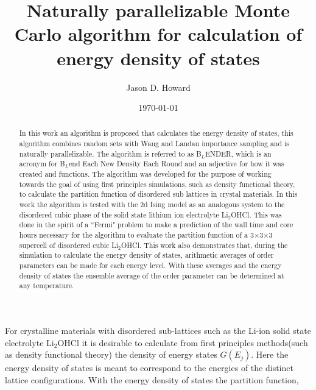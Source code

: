\documentclass[aps,prl,reprint,superscriptaddress,showkeys]{revtex4-1}
\begin{document}
\title{ Naturally   parallelizable  Monte Carlo  algorithm for calculation of energy density of states}

\author{Jason D. Howard}

\date{\today}

%


\begin{acknowledgments}
\end{acknowledgments}
\begin{abstract}
In this work  an algorithm  is proposed that calculates the energy density of states, this algorithm combines random sets with Wang and Landau importance sampling  and is naturally parallelizable. The algorithm is referred to as B$_L$ENDER, which is an acronym for B$_L$end Each New Density Each Round and an  adjective for  how it was created and functions. The algorithm was developed for the purpose of working towards the goal of using first principles simulations, such as density functional theory, to calculate the partition function of disordered sub lattices in crystal materials. In this work  the algorithm is tested with the 2d Ising model as an analogous system to the disordered cubic phase of the solid state lithium ion electrolyte Li$_2$OHCl. This was done in the spirit of a ``Fermi" problem to make a prediction of the  wall time and core hours necessary for the algorithm to evaluate the partition function of a 3$\times$3$\times$3 supercell of disordered cubic Li$_2$OHCl. This work also demonstrates that, during the simulation to calculate the energy density of states, arithmetic averages of  order parameters can be made for each energy level. With these averages and the energy density of states the ensemble average of the order parameter can be determined at any temperature. 
\end{abstract}
\maketitle
For crystalline  materials  with disordered sub-lattices such as the Li-ion solid state electrolyte  Li$_2$OHCl\cite{Hood, Goodenough, Schwering, Holzwarth_group, Song_Borodin} it is desirable to calculate from first principles methods(such as density functional theory\cite{kohn:1965}) the density of energy states $G(E_j)$. Here the energy density of states is meant to correspond to the energies of the distinct lattice configurations. With the energy density of states the partition function,
\end{document}
